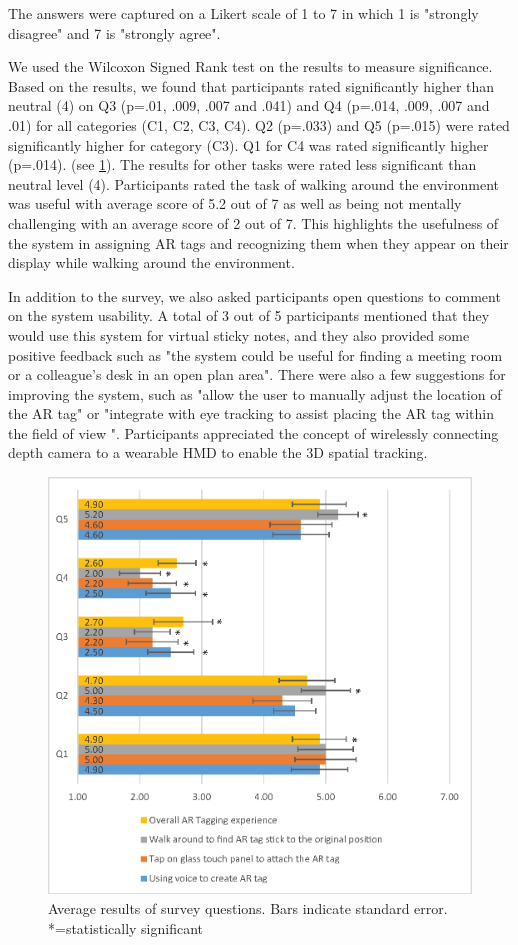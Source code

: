 The answers were captured on a Likert scale of 1 to 7 in which 1 is "strongly disagree" and 7 is "strongly agree".

We used the Wilcoxon Signed Rank test on the results to measure significance. Based on the results, we found that participants rated significantly higher than neutral (4) on Q3 (p=.01, .009, .007 and .041) and Q4 (p=.014, .009, .007 and .01) for all categories (C1, C2, C3, C4). Q2 (p=.033) and Q5 (p=.015) were rated significantly higher for category (C3). Q1 for C4 was rated significantly higher (p=.014). (see \ref{survey_results}). The results  for other tasks were rated less significant than neutral level (4). Participants rated the task of walking around the environment was useful with average score of 5.2 out of 7 as well as being not mentally challenging with an average score of 2 out of 7. This highlights the usefulness of the system in assigning AR tags and recognizing them when they appear on their display while walking around the environment. 

In addition to the survey, we also asked participants open questions to comment on the system usability. A total of 3 out of 5 participants mentioned that they would use this system for virtual sticky notes, and they also provided some positive feedback such as "the system could be useful for finding a meeting room or a colleague's desk in an open plan area". There were also a few suggestions for improving the system, such as "allow the user to manually adjust the location of the AR tag" or "integrate with eye tracking to assist placing the AR tag within the field of view ". Participants appreciated  the concept of wirelessly connecting depth camera to a wearable HMD to enable the 3D spatial tracking.    


\begin{figure}[ht]
  \centering
  \includegraphics[width=\linewidth]{images/mgia16/user_study_results2}
  \caption{Average results of survey questions. Bars indicate standard error. *=statistically significant}
	\label{survey_results}
\end{figure}


